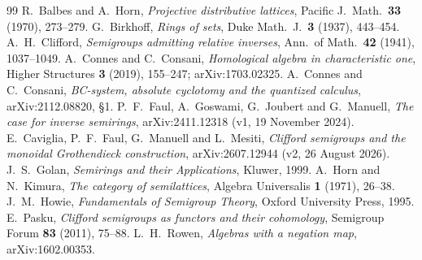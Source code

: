 \documentclass[11pt]{amsart}
\theoremstyle{remark}
\begin{document}
\begin{thebibliography}{99}
 R.~Balbes and A.~Horn, \emph{Projective distributive lattices}, Pacific J.\ Math.\ \textbf{33} (1970), 273--279.
 G.~Birkhoff, \emph{Rings of sets}, Duke Math.\ J.\ \textbf{3} (1937), 443--454.
 A.~H.~Clifford, \emph{Semigroups admitting relative inverses}, Ann.\ of Math.\ \textbf{42} (1941), 1037--1049.
 A.~Connes and C.~Consani, \emph{Homological algebra in characteristic one}, Higher Structures \textbf{3} (2019), 155--247; arXiv:1703.02325.
 A.~Connes and C.~Consani, \emph{BC-system, absolute cyclotomy and the quantized calculus}, arXiv:2112.08820, \S1.
 P.~F.~Faul, A.~Goswami, G.~Joubert and G.~Manuell, \emph{The case for inverse semirings}, arXiv:2411.12318 (v1, 19 November 2024).
 E.~Caviglia, P.~F.~Faul, G.~Manuell and L.~Mesiti, \emph{Clifford semigroups and the monoidal Grothendieck construction}, arXiv:2607.12944 (v2, 26 August 2026).
 J.~S.~Golan, \emph{Semirings and their Applications}, Kluwer, 1999.
 A.~Horn and N.~Kimura, \emph{The category of semilattices}, Algebra Universalis \textbf{1} (1971), 26--38.
 J.~M.~Howie, \emph{Fundamentals of Semigroup Theory}, Oxford University Press, 1995.
 E.~Pasku, \emph{Clifford semigroups as functors and their cohomology}, Semigroup Forum \textbf{83} (2011), 75--88.
 L.~H.~Rowen, \emph{Algebras with a negation map}, arXiv:1602.00353.
\end{thebibliography}
\end{document}
